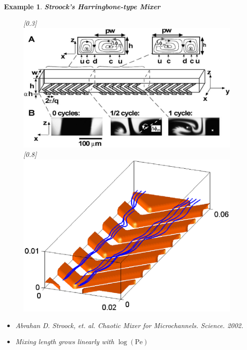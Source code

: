 \documentclass[dvips,landscape]{foils}
\newtheorem{example}{Example}
\begin{document}
\newpage
\begin{example}{\bfseries Stroock's Harringbone-type Mixer}
  \begin{figure}
    \centerline{
       \scalebox{0.3}[0.3]{\includegraphics{stroockmixer}}
       \scalebox{0.8}[0.8]{\includegraphics{stroockstructure}}
    }
  \end{figure}
\begin{itemize}\setlength{\parskip}{0pt}  \setlength{\itemsep}{10pt} \setlength{\topsep}{0pt}
\item Abrahan D. Stroock, et. al. Chaotic Mixer for Microchannels. Science. 2002. 
\item Mixing length grows linearly with $\log(\text{Pe})$ 
\end{itemize}
\end{example}
\end{document}

